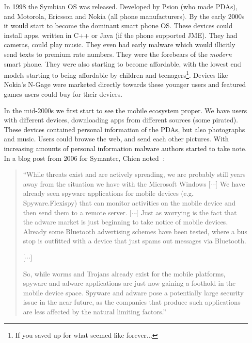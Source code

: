 \documentclass[thesis.tex]{subfiles}
\begin{document}
In 1998 the Symbian OS was released.  Developed by Psion (who made
\acp{PDA}), and Motorola, Ericsson and Nokia (all phone
manufacturers).  By the early 2000s it would start to become the
dominant smart phone OS.  These devices could install apps, written in
C++ or Java (if the phone supported JME). They had cameras, could play
music. They even had early malware which would illicitly send texts to
premium rate numbers.  They were the forebears of the \emph{modern}
smart phone.
They were also starting to become affordable, with the lowest end
models starting to being affordable by children and
teenagers\footnote{If you saved up for what seemed like
  forever$\ldots$}.  Devices like Nokia's N-Gage were marketed directly
towards these younger users and featured games users could buy for
their devices.

In the mid-2000s we first start to see the mobile
ecosystem proper.  We have users with different devices, downloading
apps from different sources (some pirated).  These devices
contained personal information of the \acp{PDA}, but also photographs
and music.  Users could browse the web, and send each other pictures.
With increasing amounts of personal information malware authors
started to take note.  In a blog post from 2006 for Symantec, Chien
noted~\cite{eric_chien_spyware_2006}:

\begin{quote}
  ``While threats exist and are actively spreading, we are probably
  still years away from the situation we have with the Microsoft Windows
  [$\cdots$] We have already seen spyware applications for mobile devices
  (e.g. Spyware.Flexispy) that can monitor activities on the mobile
  device and then send them to a remote server. [$\cdots$] Just as
  worrying is the fact that the adware market is just beginning to take
  notice of mobile devices. Already some Bluetooth advertising schemes
  have been tested, where a bus stop is outfitted with a device that
  just spams out messages via Bluetooth.

  [$\cdots$]
  
  So, while worms and Trojans already exist for the mobile
  platforms, spyware and adware applications are just now gaining a
  foothold in the mobile device space. Spyware and adware pose a
  potentially large security issue in the near future, as the companies
  that produce such applications are less affected by the natural
  limiting factors.''
\end{quote}
\end{document}

